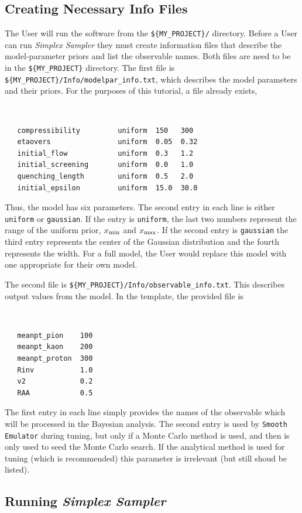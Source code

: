 \documentclass[UserManual.tex]{subfiles}
\begin{document}
\subsection{Creating Necessary Info Files}
The User will run the software from the {\tt \$\{MY\_PROJECT\}/} directory. Before a User can run {\it Simplex Sampler} they must create information files that describe the model-parameter priors and list the observable names. Both files are need to be in the {\tt \$\{MY\_PROJECT\}} directory. The first file is {\tt \$\{MY\_PROJECT\}/Info/modelpar\_info.txt}, which describes the model parameters and their priors. For the purposes of this tutorial, a file already exists,
{\tt
\begin{verbatim}
   compressibility         uniform  150   300
   etaovers                uniform  0.05  0.32
   initial_flow            uniform  0.3   1.2
   initial_screening       uniform  0.0   1.0
   quenching_length        uniform  0.5   2.0
   initial_epsilon         uniform  15.0  30.0
\end{verbatim}
}
Thus, the model has six parameters. The second entry in each line is either {\tt uniform} or {\tt gaussian}. If the entry is {\tt uniform}, the last two numbers represent the range of the uniform prior, $x_{\rm min}$ and $x_{\rm max}$. If the second entry is {\tt gaussian} the third entry represents the center of the Gaussian distribution and the fourth represents the width. For a full model, the User would replace this model with one appropriate for their own model.

The second file is {\tt \$\{MY\_PROJECT\}/Info/observable\_info.txt}. This describes output values from the model. In the template, the provided file is
{\tt
\begin{verbatim}
   meanpt_pion    100      
   meanpt_kaon    200      
   meanpt_proton  300      
   Rinv           1.0      
   v2             0.2     
   RAA            0.5
\end{verbatim}
}
The first entry in each line simply provides the names of the observable which will be processed in the Bayesian analysis.  The second entry is used by {\tt Smooth Emulator} during tuning, but only if a Monte Carlo method is used, and then is only used to seed the Monte Carlo search. If the analytical method is used for tuning (which is recommended) this parameter is irrelevant (but still shoud be listed).

\subsection{Running {\it Simplex Sampler}}
\end{document}
